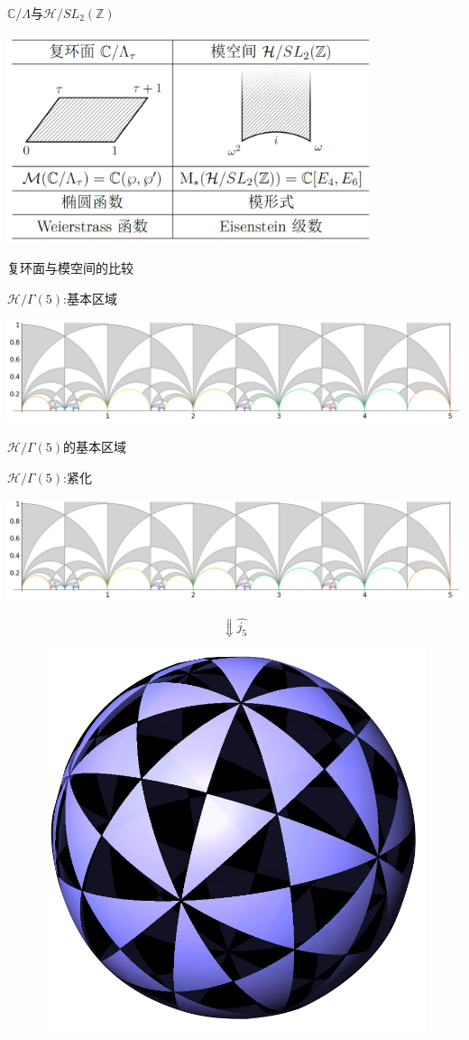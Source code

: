 \documentclass[pdf]{beamer}
\numberwithin{equation}{section}
\theoremstyle{plain}
\theoremstyle{plain}
\theoremstyle{remark}
\begin{document}
	\begin{frame}[label=thereturn]{$\mathbb{C}/\Lambda$与$\mathcal{H}/SL_2(\mathbb{Z})$}
\begin{table}[ht]
	\centering
	\includegraphics[width=0.8\textwidth]{snip/table-torus-moduli.png}
	\caption{复环面与模空间的比较}
	\label{tb:torus-moduli}
\end{table}
\hyperlink{thetafcts}{}
\end{frame}

\begin{frame}{$\mathcal{H}/\Gamma(5)$:基本区域}
\begin{table}[ht]
	\centering
	\includegraphics[width=1\textwidth]{sage/X(5).png}
	\caption{$\mathcal{H}/\Gamma(5)$的基本区域}
	
\end{table}

\end{frame}
\begin{frame}{$\mathcal{H}/\Gamma(5)$:紧化}
\begin{table}[ht]
	\centering
	\includegraphics[width=1\textwidth]{sage/X(5).png}
\end{table}
$$\Downarrow \hat{j_5}$$
\begin{figure}[ht]
	\centering
	\includegraphics[width=.2\textwidth]{fromweb/Gamma235.png}
\end{figure}
\end{frame}
\end{document}

